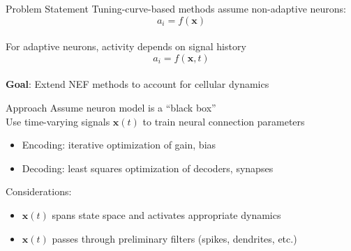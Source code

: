 \documentclass[aspectratio=169]{beamer}
\begin{document}
\begin{frame}{Problem Statement}
Tuning-curve-based methods assume non-adaptive neurons:
\begin{equation*}
    a_i = f(\mathbf{x})
\end{equation*} \\
\vspace{1cm}
For adaptive neurons, activity depends on signal history
\begin{equation*}
    a_i = f(\mathbf{x}, t)
\end{equation*} \\
\vspace{1cm}
\textbf{Goal}: Extend NEF methods to account for cellular dynamics
\end{frame}

\begin{frame}[fragile]{Approach}
Assume neuron model is a ``black box'' \\
\vspace{0.5cm}
Use time-varying signals $\mathbf{x}(t)$ to train neural connection parameters
\begin{itemize}
    \item Encoding: iterative optimization of gain, bias  %
    \item Decoding: least squares optimization of decoders, synapses  %
\end{itemize}
\vspace{0.5cm}
Considerations:
\begin{itemize}
    \item $\mathbf{x}(t)$ spans state space and activates appropriate dynamics
    \item $\mathbf{x}(t)$ passes through preliminary filters (spikes, dendrites, etc.)
\end{itemize}
\end{frame}
\end{document}
